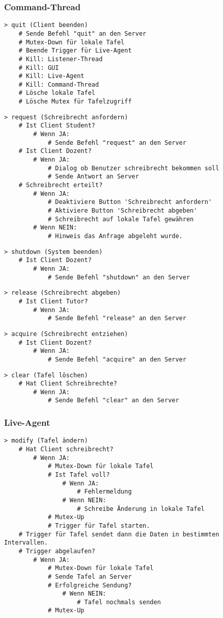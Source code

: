 \subsubsection{Command-Thread}
\begin{lstlisting}
> quit (Client beenden)
    # Sende Befehl "quit" an den Server
    # Mutex-Down für lokale Tafel
    # Beende Trigger für Live-Agent
    # Kill: Listener-Thread
    # Kill: GUI
    # Kill: Live-Agent
    # Kill: Command-Thread
    # Lösche lokale Tafel
    # Lösche Mutex für Tafelzugriff
\end{lstlisting}
\begin{lstlisting}
> request (Schreibrecht anfordern)
    # Ist Client Student?
        # Wenn JA:
            # Sende Befehl "request" an den Server
    # Ist Client Dozent?
        # Wenn JA:
            # Dialog ob Benutzer schreibrecht bekommen soll
            # Sende Antwort an Server
    # Schreibrecht erteilt?
        # Wenn JA:
            # Deaktiviere Button 'Schreibrecht anfordern'
            # Aktiviere Button 'Schreibrecht abgeben'
            # Schreibrecht auf lokale Tafel gewähren
        # Wenn NEIN:
            # Hinweis das Anfrage abgeleht wurde.
\end{lstlisting}
\begin{lstlisting}
> shutdown (System beenden)
    # Ist Client Dozent?
        # Wenn JA:
            # Sende Befehl "shutdown" an den Server
\end{lstlisting}
\begin{lstlisting}
> release (Schreibrecht abgeben)
    # Ist Client Tutor?
        # Wenn JA:
            # Sende Befehl "release" an den Server
\end{lstlisting}
\begin{lstlisting}
> acquire (Schreibrecht entziehen)
    # Ist Client Dozent?
        # Wenn JA:
            # Sende Befehl "acquire" an den Server
\end{lstlisting}
\begin{lstlisting}
> clear (Tafel löschen)
    # Hat Client Schreibrechte?
        # Wenn JA:
            # Sende Befehl "clear" an den Server
\end{lstlisting}

\subsubsection{Live-Agent}
\begin{lstlisting}
> modify (Tafel ändern)
    # Hat Client schreibrecht?
        # Wenn JA:
            # Mutex-Down für lokale Tafel
            # Ist Tafel voll?
                # Wenn JA:
                    # Fehlermeldung
                # Wenn NEIN:
                    # Schreibe Änderung in lokale Tafel
            # Mutex-Up
            # Trigger für Tafel starten.
    # Trigger für Tafel sendet dann die Daten in bestimmten Intervallen.
    # Trigger abgelaufen?
        # Wenn JA:
            # Mutex-Down für lokale Tafel
            # Sende Tafel an Server
            # Erfolgreiche Sendung?
                # Wenn NEIN:
                    # Tafel nochmals senden
            # Mutex-Up
\end{lstlisting}

